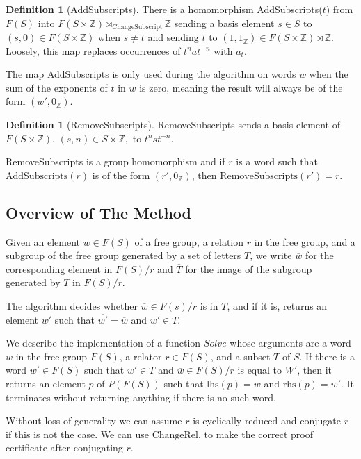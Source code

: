 \documentclass[11pt]{article} %
\theoremstyle{definition}
\theoremstyle{definition}
\theoremstyle{definition}
\theoremstyle{definition}
\theoremstyle{definition}
\newtheorem{defn}[theorem]{Definition}
\theoremstyle{definition}
\begin{document}
\begin{defn}[AddSubscripts]\label{AddSubscripts}
  There is a homomorphism AddSubscripts($t$) from $F(S)$ into $F(S \times \mathbb{Z})
  \rtimes_{\text{ChangeSubscript}} \mathbb{Z}$ sending a basis element $s \in S$ to
  $(s, 0) \in F(S \times \mathbb{Z})$ when $s \ne t$ and sending $t$ to
  $(1, 1_\mathbb{Z}) \in F(S \times \mathbb{Z}) \rtimes \mathbb{Z}$. Loosely, this map
  replaces occurrences of $t^n a t^{-n}$ with $a_t$.
\end{defn}

The map AddSubscripts is only used during the algorithm on words $w$ when the sum of the
exponents of $t$ in $w$ is zero, meaning the result will always be of the form
$(w', 0_{\mathbb{Z}})$.

\begin{defn}[RemoveSubscripts]
  RemoveSubscripts sends a basis element of $F(S\times \mathbb{Z})$,  $(s, n) \in S\times \mathbb{Z},$
  to $t^n s t^{-n}$.
\end{defn}
RemoveSubscripts is a group homomorphism and if $r$ is a word such that $\text{AddSubscripts}(r)$ is of the form $(r', 0_\mathbb{Z})$,
then $\text{RemoveSubscripts}(r')=r$.

\subsection{Overview of The Method}

Given an element $w \in F(S)$ of a free group, a relation $r$ in the free group, and a subgroup of the free group
generated by a set of letters $T$,
we write $\overline {w}$ for the corresponding element in $F(S) / r$
and $\overline{T}$ for the image of the subgroup generated by $T$ in $F(S)/r$.

The algorithm decides whether $\overline{w} \in F(s) / r$ is in $\overline{T}$,
and if it is, returns an element $w'$ such that $\overline{w'} = \overline{w}$ and $w' \in T$.

We describe the implementation of a function $\textit{Solve}$ whose arguments are a word $w$
in the free group $F(S)$, a relator $r \in F(S)$,
and a subset $T$ of $S$. If there is a word $w' \in F(S)$
such that $w' \in T$ and $\overline{w} \in F(S) / r$ is
equal to $\overline{W'}$, then it returns an element $p$ of $P(F(S))$
such that $\text{lhs}(p) = w$ and $\text{rhs}(p) = w'$. It terminates
without returning anything if there is no such word.

Without loss of generality we can assume $r$ is cyclically reduced and
conjugate $r$ if this is not the case. We can use $\text{ChangeRel}$,
to make the correct proof certificate after conjugating $r$.
\end{document}
